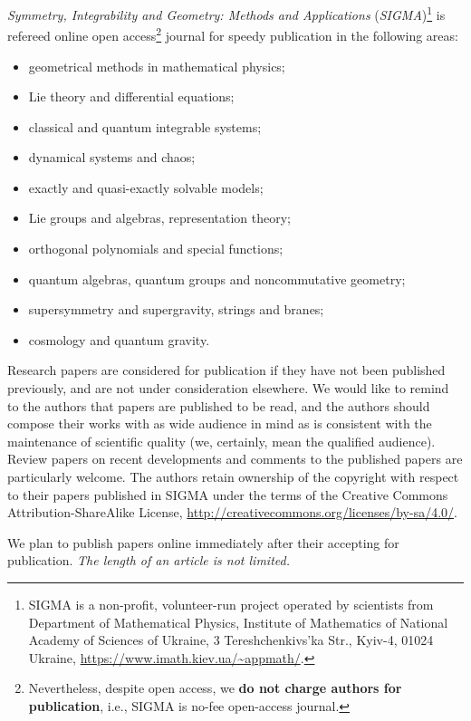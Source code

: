 \documentclass[pdftex]{sigma}
\numberwithin{equation}{section}
\begin{document}
{\it Symmetry, Integrability and Geometry: Methods and Applications}
({\it SIGMA})\footnote{SIGMA is a non-profit, volunteer-run project operated by
scientists from Department of Mathematical Physics,
Institute of Mathematics of National Academy of Sciences of Ukraine,
3 Tereshchenkivs'ka Str., Kyiv-4, 01024 Ukraine,  \url{https://www.imath.kiev.ua/~appmath/}.}
is refereed online open access\footnote{Nevertheless, despite open access, we {\bf do not charge authors for publication}, i.e., SIGMA is no-fee open-access journal.} journal for speedy publication in the following areas:
\begin{itemize}
\itemsep=0pt
\item geometrical methods in mathematical physics;
\item Lie theory and differential equations;
\item  classical and quantum integrable systems;
\item  dynamical systems and chaos;
\item  exactly and quasi-exactly solvable models;
\item Lie groups and algebras, representation theory;
\item  orthogonal polynomials and special functions;
\item  quantum algebras, quantum groups and noncommutative geometry;
\item  supersymmetry and supergravity, strings and branes;
\item  cosmology and quantum gravity.
\end{itemize}

Research papers are considered for publication
if they have not been published previously, and are not under consideration elsewhere.
We would like to remind to the authors that papers are published to be read,
and the authors should compose their works with as wide audience
in mind as is consistent with the maintenance of
scientific quality (we, certainly, mean the qualified audience).
Review papers on recent
developments and comments to the published papers are particularly welcome.
The authors retain ownership of the copyright with respect to their papers published in SIGMA under the terms of the Creative Commons Attribution-ShareAlike License, \url{http://creativecommons.org/licenses/by-sa/4.0/}.


We plan to publish papers online immediately after their
accepting for publication.
{\it The length of an article is not limited.}
\end{document}
